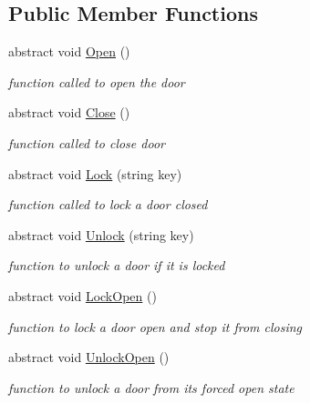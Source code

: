 \subsection*{Public Member Functions}
\begin{DoxyCompactItemize}
\item 
abstract void \mbox{\hyperlink{class_base_door_a418df6f73cc5c56b6989c0512a6a909b}{Open}} ()
\begin{DoxyCompactList}\small\item\em function called to open the door \end{DoxyCompactList}\item 
abstract void \mbox{\hyperlink{class_base_door_a94151e5cbf90bd3d2b55f339b87916c7}{Close}} ()
\begin{DoxyCompactList}\small\item\em function called to close door \end{DoxyCompactList}\item 
abstract void \mbox{\hyperlink{class_base_door_a2b616c52626299f25ac25f7deab44dc4}{Lock}} (string key)
\begin{DoxyCompactList}\small\item\em function called to lock a door closed \end{DoxyCompactList}\item 
abstract void \mbox{\hyperlink{class_base_door_a1fe85317a4742aec4d03deb7c0d52fd2}{Unlock}} (string key)
\begin{DoxyCompactList}\small\item\em function to unlock a door if it is locked \end{DoxyCompactList}\item 
abstract void \mbox{\hyperlink{class_base_door_a9a851525c3b6e878bec459992ac75408}{Lock\+Open}} ()
\begin{DoxyCompactList}\small\item\em function to lock a door open and stop it from closing \end{DoxyCompactList}\item 
abstract void \mbox{\hyperlink{class_base_door_aae09177b7a5578ede6d44f758551684e}{Unlock\+Open}} ()
\begin{DoxyCompactList}\small\item\em function to unlock a door from it\textquotesingle{}s forced open state \end{DoxyCompactList}\end{DoxyCompactItemize}
